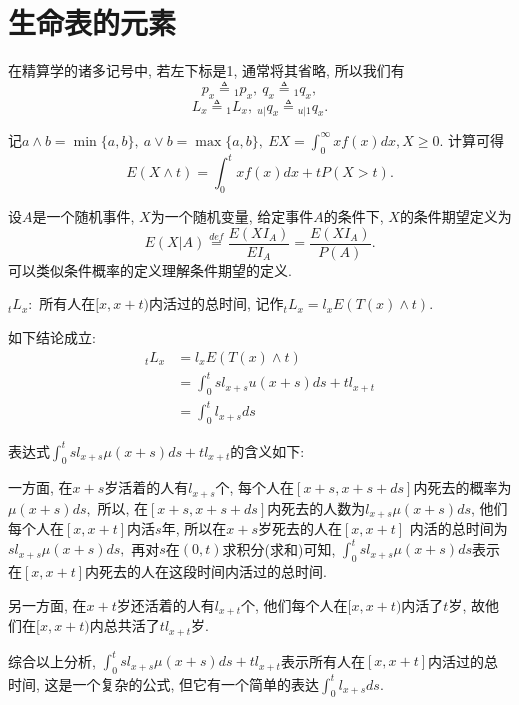 \documentclass[lang=cn,10pt]{elegantbook}
\begin{document}
\section{生命表的元素}
\begin{proposition}
    在精算学的诸多记号中, 若左下标是1, 通常将其省略, 所以我们有
    $${p_x}\triangleq{}_1p_x,~{q_x}\triangleq{}_1q_x,$$
    $$L_x\triangleq{}_1L_x,~{}_{u|}q_x\triangleq{}_{u|1}q_x.$$
\end{proposition}

\begin{proposition}
    记$a\wedge b=\min\{a,b\},\ a\vee b=\max\{a,b\},\ EX=\int_0^{\infty}xf(x)dx,X\ge0.$ 计算可得
    \begin{equation*}
        E(X\wedge t) = \int_0^txf(x)dx+tP(X>t).
    \end{equation*}
\end{proposition}

\begin{definition}[条件数学期望]
    设$A$是一个随机事件, $X$为一个随机变量, 给定事件$A$的条件下, $X$的条件期望定义为
    $$E(X|A)\overset{def}{=}\frac{E(XI_A)}{EI_A}=\frac{E(XI_A)}{P(A)}.$$
    可以类似条件概率的定义理解条件期望的定义.
\end{definition}

\begin{definition}
    ${}_tL_x:$ 所有人在$[x,x+t)$内活过的总时间, 记作$ {}_tL_x=l_xE(T(x)\wedge t).$
\end{definition}

\begin{corollary} 如下结论成立:
    \begin{align*}
        {}_tL_x & =l_xE(T(x)\wedge t)                 \\
                & =\int_0^t sl_{x+s}u(x+s)ds+tl_{x+t} \\
                & =\int_0^tl_{x+s}ds
    \end{align*}
\end{corollary}

\begin{remark}
    表达式$\int_0^tsl_{x+s}\mu(x+s)ds+tl_{x+t}$的含义如下:

    一方面, 在$x+s$岁活着的人有$l_{x+s}$个, 每个人在$[x+s,x+s+ds]$内死去的概率为$\mu(x+s)ds,$ 所以, 在$[x+s,x+s+ds]$内死去的人数为$l_{x+s}\mu(x+s)ds$, 他们每个人在$[x,x+t]$内活$s$年, 所以在$x+s$岁死去的人在$[x,x+t]$ 内活的总时间为$sl_{x+s}\mu(x+s)ds,$ 再对$s$在$(0,t)$求积分(求和)可知, $\int_0^tsl_{x+s}\mu(x+s)ds$表示在$[x,x+t]$内死去的人在这段时间内活过的总时间.

    另一方面, 在$x+t$岁还活着的人有$l_{x+t}$个, 他们每个人在$[x,x+t)$内活了$t$岁, 故他们在$[x,x+t)$内总共活了$tl_{x+t}$岁.

    综合以上分析, $\int_0^tsl_{x+s}\mu(x+s)ds+tl_{x+t}$表示所有人在$[x,x+t]$内活过的总时间, 这是一个复杂的公式, 但它有一个简单的表达$\int_0^tl_{x+s}ds.$
\end{remark}
\end{document}
